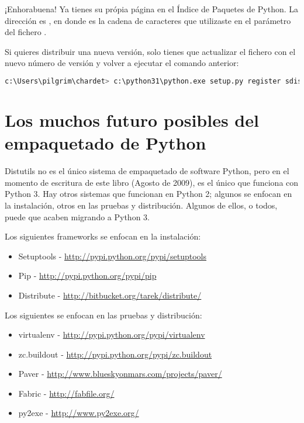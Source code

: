 {¡Enhorabuena! Ya tienes su própia página en el Índice de Paquetes de Python. La dirección es , en donde  es la cadena de caracteres que utilizaste en el parámetro  del fichero .


Si quieres distribuir una nueva versión, solo tienes que actualizar el fichero  con el nuevo número de versión y volver a ejecutar el comando anterior:

\begin{lstlisting}[language=Python,breaklines=true]
c:\Users\pilgrim\chardet> c:\python31\python.exe setup.py register sdist bdist_wininst upload
\end{lstlisting}

\section{Los muchos futuro posibles del empaquetado de Python}

Distutils no es el único sistema de empaquetado de software Python, pero en el momento de escritura de este libro (Agosto de 2009), es el único que funciona con Python 3. Hay otros sistemas que funcionan en Python 2; algunos se enfocan en la instalación, otros en las pruebas y distribución. Algunos de ellos, o todos, puede que acaben migrando a Python 3.

Los siguientes frameworks se enfocan en la instalación:

\begin{itemize}
  \item Setuptools - \href{http://pypi.python.org/pypi/setuptools}{http://pypi.python.org/pypi/setuptools}
  \item Pip - \href{http://pypi.python.org/pypi/pip}{http://pypi.python.org/pypi/pip}
  \item Distribute - \href{http://bitbucket.org/tarek/distribute/}{http://bitbucket.org/tarek/distribute/}
\end{itemize}

Los siguientes se enfocan en las pruebas y distribución:

\begin{itemize}
  \item virtualenv - \href{http://pypi.python.org/pypi/virtualenv}{http://pypi.python.org/pypi/virtualenv}
  \item zc.buildout - \href{http://pypi.python.org/pypi/zc.buildout}{http://pypi.python.org/pypi/zc.buildout}
  \item Paver - \href{http://www.blueskyonmars.com/projects/paver/}{http://www.blueskyonmars.com/projects/paver/}
  \item Fabric - \href{http://fabfile.org/}{http://fabfile.org/}
  \item py2exe - \href{http://www.py2exe.org/}{http://www.py2exe.org/}
\end{itemize}

}

